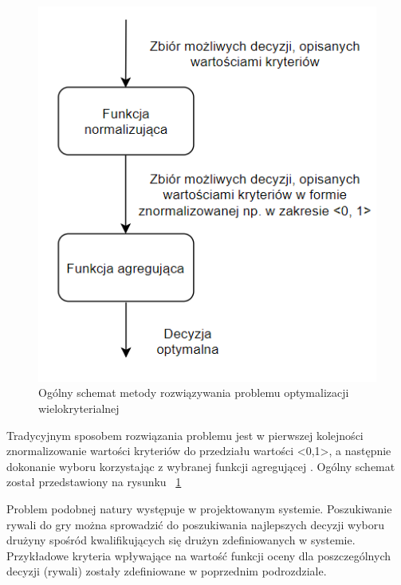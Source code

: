 \begin{figure}[ht]
\centering
\includegraphics[width=0.5\linewidth]{03-koncept/rys/tradycyjne-algorytmy-opt.PNG}
\caption{Ogólny schemat metody rozwiązywania problemu optymalizacji wielokryterialnej}
\label{fig:diagram-trad-alg-opt}
\end{figure}

Tradycyjnym sposobem rozwiązania problemu jest w pierwszej kolejności znormalizowanie wartości kryteriów do przedziału wartości <0,1>, a następnie dokonanie wyboru korzystając z wybranej funkcji agregującej \cite{optwielok}. Ogólny schemat został przedstawiony na rysunku ~\ref{fig:diagram-trad-alg-opt}

Problem podobnej natury występuje w projektowanym systemie. Poszukiwanie rywali do gry można sprowadzić do poszukiwania najlepszych decyzji wyboru drużyny spośród kwalifikujących się drużyn zdefiniowanych w systemie. Przykładowe kryteria wpływające na wartość funkcji oceny dla poszczególnych decyzji (rywali) zostały zdefiniowane w poprzednim podrozdziale.

